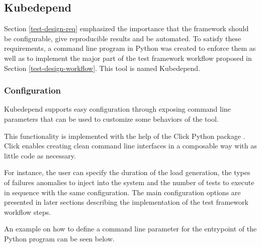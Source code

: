 \subsection{Kubedepend}


Section \ref{test-design-req} emphasized the importance that the framework should be configurable, give reproducible results and be automated. To satisfy these requirements, a command line program in Python was created to enforce them as well as to implement the major part of the test framework workflow proposed in Section \ref{test-design-workflow}. This tool is named Kubedepend.

\subsubsection{Configuration}

Kubedepend supports easy configuration through exposing command line parameters that can be used to customize some behaviors of the tool.

This functionality is implemented with the help of the Click Python package \cite{Click}. Click enables creating clean command line interfaces in a composable way with as little code as necessary.

For instance, the user can specify the duration of the load generation, the types of failures anomalies to inject into the system and the number of tests to execute in sequence with the same configuration. The main configuration options are presented in later sections describing the implementation of the test framework workflow steps.

An example on how to define a command line parameter for the entrypoint of the Python program can be seen below.

